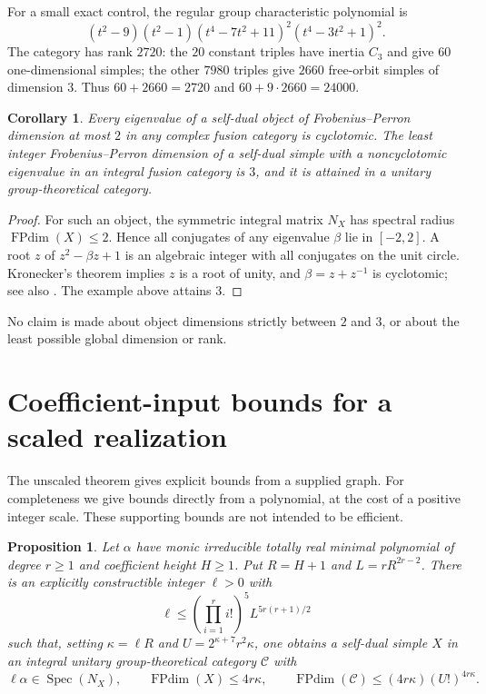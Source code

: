 \documentclass[11pt]{amsart}
\newtheorem{proposition}[theorem]{Proposition}
\newtheorem{corollary}[theorem]{Corollary}
\theoremstyle{remark}
\newcommand{\FPdim}{\operatorname{FPdim}}
\newcommand{\Spec}{\operatorname{Spec}}
\begin{document}
For a small exact control, the regular group characteristic polynomial is
\[
 (t^2-9)(t^2-1)(t^4-7t^2+11)^2(t^4-3t^2+1)^2.
\]
The category has rank $2720$: the $20$ constant triples have inertia
$C_3$ and give $60$ one-dimensional simples; the other $7980$ triples
give $2660$ free-orbit simples of dimension $3$.
Thus $60+2660=2720$ and $60+9\cdot2660=24000$.

\begin{corollary}\label{cor:three}
Every eigenvalue of a self-dual object of Frobenius--Perron dimension
at most $2$ in any complex fusion category is cyclotomic.
The least integer Frobenius--Perron dimension of a self-dual simple
with a noncyclotomic eigenvalue in an integral fusion category is $3$,
and it is attained in a unitary group-theoretical category.
\end{corollary}
\begin{proof}
For such an object, the symmetric integral matrix $N_X$ has spectral
radius $\FPdim(X)\le2$. Hence all conjugates of any eigenvalue $\beta$
lie in $[-2,2]$. A root $z$ of $z^2-\beta z+1$ is an algebraic integer
with all conjugates on the unit circle. Kronecker's theorem implies
$z$ is a root of unity, and $\beta=z+z^{-1}$ is cyclotomic; see also
\cite[Example 2.0.4]{CMS}. The example above attains $3$.
\end{proof}

No claim is made about object dimensions strictly between $2$ and $3$,
or about the least possible global dimension or rank.

\section{Coefficient-input bounds for a scaled realization}\label{sec:coeff}

The unscaled theorem gives explicit bounds from a supplied graph.
For completeness we give bounds directly from a polynomial, at the cost
of a positive integer scale. These supporting bounds are not intended
to be efficient.

\begin{proposition}\label{prop:coeff}
Let $\alpha$ have monic irreducible totally real minimal polynomial of
degree $r\ge1$ and coefficient height $H\ge1$. Put
$R=H+1$ and $L=rR^{2r-2}$. There is an explicitly constructible integer
$\ell>0$ with
\[
 \ell\le\left(\prod_{i=1}^r i!\right)^5 L^{5r(r+1)/2}
\]
such that, setting $\kappa=\ell R$ and $U=2^{\kappa+7}r^2\kappa$,
one obtains a self-dual simple $X$ in an integral unitary
group-theoretical category $\mathcal C$ with
\[
 \ell\alpha\in\Spec(N_X),\qquad
 \FPdim(X)\le4r\kappa,\qquad
 \FPdim(\mathcal C)\le(4r\kappa)(U!)^{4r\kappa}.
\]
\end{proposition}
\end{document}
